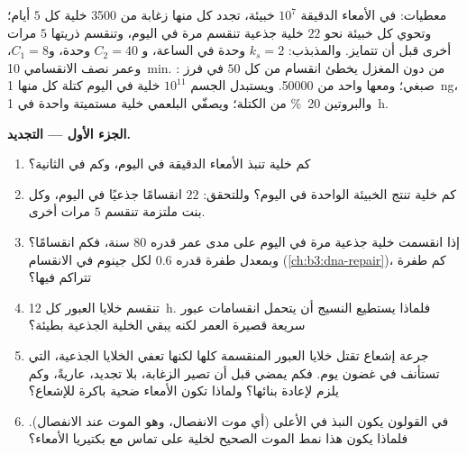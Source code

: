 \begin{problem}
\label{pb:b3:cell-cycle-apoptosis:1}
معطيات: في الأمعاء الدقيقة $10^{7}$ خبيئة، تجدد كل منها زغابة
من \num{3500} خلية كل $5$ أيام؛ وتحوي كل خبيئة نحو $22$ خلية
جذعية تنقسم مرة في اليوم، وتنقسم ذريتها $5$ مرات أخرى قبل
أن تتمايز. والمذبذب: $k_{s} = 2$ وحدة  في الساعة، و
$C_{2} = 40$ وحدة، و$C_{1} = 8$، وعمر نصف  الانقسامي
\qty{10}{min}. : من دون  المغزل يخطئ انقسام
من كل $50$ في فرز صبغي؛ ومعها واحد من \num{50000}.
ويستبدل الجسم $10^{11}$ خلية في اليوم كتلة كل منها \qty{1}{ng}، والبروتين
\qty{20}{\%} من الكتلة؛ ويصفّي البلعمي خلية مستميتة واحدة في
\qty{1}{h}.

\medskip
\noindent\textbf{الجزء الأول --- التجديد.}
\begin{enumerate}
  \item كم خلية تنبذ الأمعاء الدقيقة في اليوم، وكم في
        الثانية؟
  \item كم خلية تنتج الخبيئة الواحدة في اليوم؟ وللتحقق: $22$
        انقسامًا جذعيًا في اليوم، وكل بنت ملتزمة تنقسم $5$ مرات
        أخرى.
  \item إذا انقسمت خلية جذعية مرة في اليوم على مدى عمر قدره $80$ سنة،
        فكم انقسامًا؟ وبمعدل طفرة قدره $0.6$ لكل جينوم في
        الانقسام (\cref{ch:b3:dna-repair})، كم طفرة
        تتراكم فيها؟
  \item تنقسم خلايا العبور كل \qty{12}{h}. فلماذا يستطيع النسيج
        أن يتحمل انقسامات عبور سريعة قصيرة العمر لكنه يبقي الخلية
        الجذعية بطيئة؟
  \item جرعة إشعاع تقتل خلايا العبور المنقسمة كلها لكنها
        تعفي الخلايا الجذعية، التي تستأنف في غضون يوم. فكم
        يمضي قبل أن تصير الزغابة، بلا تجديد، عاريةً، وكم يلزم
        لإعادة بنائها؟ ولماذا تكون الأمعاء ضحية باكرة للإشعاع؟
  \item في القولون يكون النبذ في الأعلى  (أي موت الانفصال،
        وهو الموت عند الانفصال). فلماذا يكون هذا نمط الموت الصحيح
        لخلية على تماس مع بكتيريا الأمعاء؟
\end{enumerate}


\end{problem}
